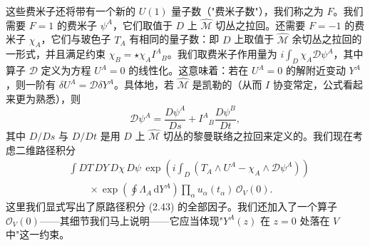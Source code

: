 \documentclass[11pt,a4paper,UTF8]{ctexart}
\theoremstyle{plain}
\theoremstyle{definition}
\begin{document}

这些费米子还将带有一个新的 $U(1)$ 量子数（"费米子数"），我们称之为 $F$。我们需要 $F=1$ 的费米子 $\psi^A$，它们取值于 $D$ 上 $\widehat{\mathcal{M}}$ 切丛之拉回。还需要 $F=-1$ 的费米子 $\chi_A$，它们与玻色子 $T_A$ 有相同的量子数：即 $D$ 上取值于 $\widehat{\mathcal{M}}$ 余切丛之拉回的一形式，并且满足约束 $\chi_B=\star\chi_A I^A{}_B$。我们取费米子作用量为 $i\int_D\chi_A\mathcal{D}\psi^A$，其中算子 $\mathcal{D}$ 定义为方程 $U^A=0$ 的线性化。这意味着：若在 $U^A=0$ 的解附近变动 $Y^A$，则一阶有 $\delta U^A=\mathcal{D}\delta Y^A$。具体地，若 $\widehat{\mathcal{M}}$ 是凯勒的（从而 $I$ 协变常定，公式看起来更为熟悉），则
\begin{equation}
    \mathcal{D}\psi^A=\frac{D\psi^A}{Ds}+I^A{}_B\frac{D\psi^B}{Dt},
    \tag{2.48}
\end{equation}
其中 $D/Ds$ 与 $D/Dt$ 是用 $D$ 上 $\widehat{\mathcal{M}}$ 切丛的黎曼联络之拉回来定义的。我们现在考虑二维路径积分
\begin{equation}
\begin{split}
    &\int DT\,DY\,D\chi\,D\psi\,\exp\left(i\int_D\left(T_A\wedge U^A-\chi_A\wedge\mathcal{D}\psi^A\right)\right)\\
    &\qquad\times\exp\left(\oint\Lambda_A\,\mathrm{d}Y^A\right)\prod_\alpha u_\alpha(t_\alpha)\,\mathcal{O}_V(0).
\end{split}
    \tag{2.49}
\end{equation}
这里我们显式写出了原路径积分 (2.43) 的全部因子。我们还加入了一个算子 $\mathcal{O}_V(0)$——其细节我们马上说明——它应当体现"$Y^A(z)$ 在 $z=0$ 处落在 $V$ 中"这一约束。
\end{document}
